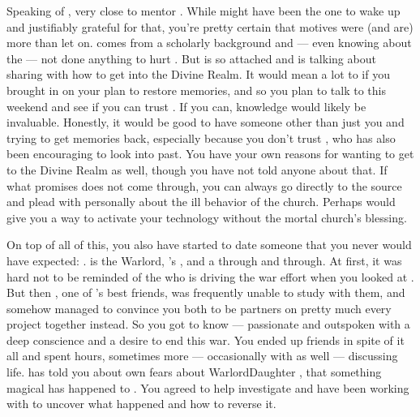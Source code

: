 \documentclass[char]{GL2020}
\begin{document}
{{Speaking of \cDisney{}, \cDisney{\they} \cDisney{\are} very close to \cDisney{\their} mentor \cWildCard{\full}. While \cWildCard{} might have been the one to wake \cDisney{} up and \cDisney{\they} \cDisney{\are} justifiably grateful for that, you're pretty certain that \cWildCard{\their} motives were (and are) more than \cWildCard{\they} let\cWildCard{\verbs} on.  \cWildCard{} comes from a scholarly background and — even knowing about the \cDisneySect{} — \cWildCard{\they \have} not done anything to hurt \cDisney{}. But \cDisney{} is so attached and is talking about sharing with \cWildCard{} how to get into the Divine Realm. It would mean a lot to \cDisney{} if you brought \cWildCard{} in on your plan to restore \cDisney{\their} memories, and so you plan to talk to \cWildCard{\them} this weekend and see if you can trust \cWildCard{\them}. If you can, \cWildCard{\their} knowledge would likely be invaluable. Honestly, it would be good to have someone other than just you and \cDisney{} trying to get \cDisney{\their} memories back, especially because you don’t trust \cPirateChild{}, who has also been encouraging \cDisney{} to look into \cDisney{\their} past. You have your own reasons for wanting to get to the Divine Realm as well, though you have not told anyone about that. If what \cChupInventor{} promises does not come through, you can always go directly to the source and plead with \cTechGod{} personally about the ill behavior of the church. Perhaps \cTechGod{} would give you a way to activate your technology without the mortal church’s blessing.

On top of all of this, you also have started to date someone that you never would have expected: \cWarlordDaughter{\full}. \cWarlordDaughter{} is the \pShippie{} Warlord, \cLoud{\full}'s \cWarlordDaughter{\offspring}, and a \pShippie{} through and through. At first, it was hard not to be reminded of the \cLoud{\person} who is driving the war effort when you looked at \cWarlordDaughter{\them}. But then \cInitiate{\full}, one of \cWarlordDaughter{}’s best friends, was frequently unable to study with them, and somehow managed to convince you both to be partners on pretty much every project together instead. So you got to know \cWarlordDaughter{} — passionate and outspoken with a deep conscience and a desire to end this war. You ended up friends in spite of it all and spent hours, sometimes more — occasionally with \cScholarship{} as well — discussing life.  \cWarlordDaugher{} has told you about \cWarlordDaughter{\their} own fears about WarlordDaughter{\their} \cLoud{\parent}, that something magical has happened to \cLoud{\them}. You agreed to help investigate and have been working with \cWarlordDaugher{\them} to uncover what happened and how to reverse it. 

}}
\end{document}

